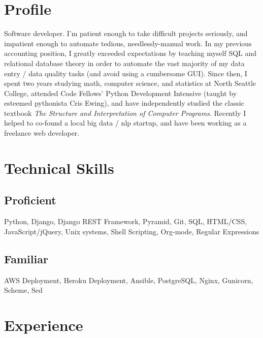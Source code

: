 \documentclass[10pt,a4paper,sans]{moderncv}        %
\begin{document}
\makecvtitle

\section{Profile}
Software developer. I'm patient enough to take difficult projects seriously, and
impatient enough to automate tedious, needlessly-manual work. In my previous
accounting position, I greatly exceeded expectations by teaching myself SQL and
relational database theory in order to automate the vast majority of my data
entry / data quality tasks (and avoid using a cumbersome GUI). Since then, I
spent two years studying math, computer science, and statistics at North Seattle
College, attended Code Fellows' Python Development Intensive (taught by esteemed
pythonista Cris Ewing), and have independently studied the classic textbook
\textit{The Structure and Interpretation of Computer Programs}. Recently I
helped to co-found a local big data / nlp startup, and have been working as a
freelance web developer.

\section{Technical Skills}
\subsection{Proficient}
Python, Django, Django REST Framework, Pyramid, Git, SQL, HTML/CSS,
JavaScript/jQuery, Unix systems, Shell Scripting, Org-mode, Regular Expressions
\subsection{Familiar}
AWS Deployment, Heroku Deployment, Ansible, PostgreSQL, Nginx, Gunicorn, Scheme, Sed

\section{Experience}

\begin{comment}
\cventry
{date - date}
{Employer}
{Job Title}
{}
{City, State}
{Description of work
    \begin{itemize}
    \item specific achievement
    \item specific achievement
    \end{itemize}}
\end{comment}
\end{document}

